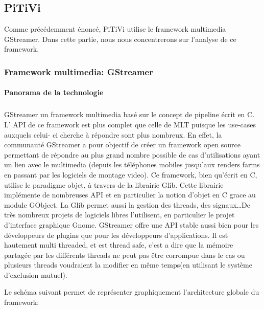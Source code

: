 \subsection {PiTiVi}

Comme précédemment énoncé, PiTiVi utilise le framework multimedia
GStreamer. Dans cette partie, nous nous concentrerons sur l'analyse de
ce framework.

\subsubsection {Framework multimedia: GStreamer}

\paragraph {Panorama de la technologie} \subparagraph{}

GStreamer un framework multimedia basé sur le concept de pipeline
écrit en C.  L' API de ce framework est plus complet que celle de
MLT puisque les use-cases auxquels celui- ci cherche à
répondre sont plus nombreux. En effet, la communauté GStreamer a pour
objectif de créer un framework open source permettant de répondre au
plus grand nombre possible de cas d'utilisations ayant un lien avec le
multimedia (depuis les téléphones mobiles jusqu'aux renders farms
en passant par les logiciels de montage video).  Ce framework, bien
qu'écrit en C, utilise le paradigme objet, à travers de la librairie
Glib. Cette librairie implémente de nombreuses API et en particulier
la notion d'objet en C grace au module GObject. La Glib permet aussi
la gestion des threads, des signaux\ldots De très nombreux projets
de logiciels libres l'utilisent, en particulier le projet d'interface
graphique Gnome. GStreamer offre une API stable aussi bien pour les
développeurs de plugins que pour les développeurs d'applications. Il
est hautement multi threaded, et est thread
safe, c'est a dire que la mémoire partagée par les différents threads
ne peut pas être corrompue dans le cas ou plusieurs threads voudraient
la modifier en même temps(en utilisant le système d'exclusion mutuel).

Le schéma suivant permet de représenter graphiquement l'architecture
globale du framework:

